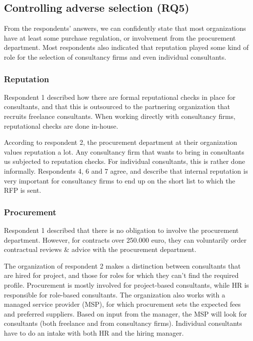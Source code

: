 \documentclass[
  man,floatsintext]{apa6}
\begin{document}
\subsection{Controlling adverse selection (RQ5)}\label{controlling-adverse-selection-rq5}

From the respondents' answers, we can confidently state that most organizations have at least some purchase regulation, or involvement from the procurement department. Most respondents also indicated that reputation played some kind of role for the selection of consultancy firms and even individual consultants.

\subsubsection{Reputation}\label{reputation-1}

Respondent 1 described how there are formal reputational checks in place for consultants, and that this is outsourced to the partnering organization that recruits freelance consultants. When working directly with consultancy firms, reputational checks are done in-house.

According to respondent 2, the procurement department at their organization values reputation a lot. Any consultancy firm that wants to bring in consultants us subjected to reputation checks. For individual consultants, this is rather done informally. Respondents 4, 6 and 7 agree, and describe that internal reputation is very important for consultancy firms to end up on the short list to which the RFP is sent.

\subsubsection{Procurement}\label{procurement}

Respondent 1 described that there is no obligation to involve the procurement department. However, for contracts over 250.000 euro, they can voluntarily order contractual reviews \& advice with the procurement department.

The organization of respondent 2 makes a distinction between consultants that are hired for project, and those for roles for which they can't find the required profile. Procurement is mostly involved for project-based consultants, while HR is responsible for role-based consultants. The organization also works with a managed service provider (MSP), for which procurement sets the expected fees and preferred suppliers. Based on input from the manager, the MSP will look for consultants (both freelance and from consultancy firms). Individual consultants have to do an intake with both HR and the hiring manager.
\end{document}
